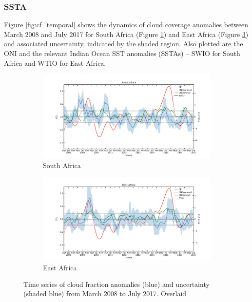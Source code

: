 \subsubsection{SSTA}
Figure \ref{fig:cf_temporal} shows the dynamics of cloud coverage
anomalies between March 2008 and July 2017 for South Africa (Figure
\ref{fig:cf_t_south}) and East Africa (Figure \ref{fig:cf_t_east}) and
associated uncertainty, indicated by the shaded region. Also plotted
are the ONI and the relevant Indian Ocean SST anomalies (SSTAs) -- SWIO
for South Africa and WTIO for East Africa.
\begin{figure}
  \centering
  \begin{subfigure}{\textwidth}
    \centering
    \includegraphics[width=\textwidth]{figures/cf_oni_io_capetown_5window_median}
    \caption{South Africa}
    \label{fig:cf_t_south}
  \end{subfigure}
  \begin{subfigure}{\textwidth}
    \centering
    \includegraphics[width=\textwidth]{figures/cf_oni_io_eastafrica_5window_median}
    \caption{East Africa}
    \label{fig:cf_t_east}
    \end{subfigure}
  \caption{Time series of cloud fraction anomalies (blue) and
    uncertainty (shaded blue) from March 2008 to July 2017. Overlaid
}
\end{figure}
